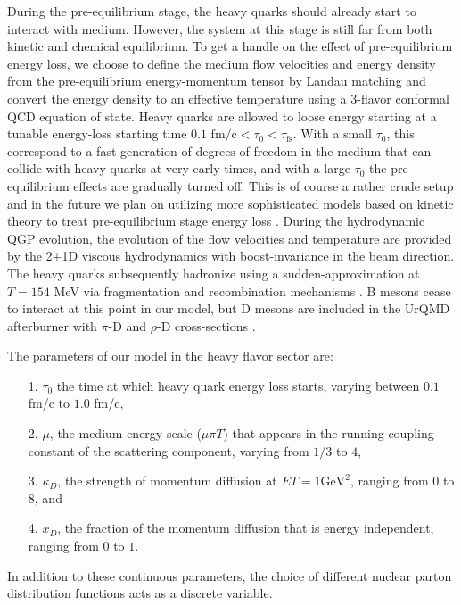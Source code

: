 \documentclass[aps, prc, reprint, amsmath, groupedaddress, nofootinbib]{revtex4-1}
\begin{document}
During the pre-equilibrium stage, the heavy quarks should already start to interact with medium.
However, the system at this stage is still far from both kinetic and chemical equilibrium.
To get a handle on the effect of pre-equilibrium energy loss, we choose to define the medium flow velocities and energy density from the pre-equilibrium energy-momentum tensor by Landau matching and convert the energy density to an effective temperature using a 3-flavor conformal QCD equation of state. 
Heavy quarks are allowed to loose energy starting at a tunable energy-loss starting time $0.1\textrm{ fm/c} < \tau_0 < \tau_{\textrm{fs}}$. 
With a small $\tau_0$, this correspond to a fast generation of degrees of freedom in the medium that can collide with heavy quarks at very early times, and with a large $\tau_0$ the pre-equilibrium effects are gradually turned off.
This is of course a rather crude setup and in the future we plan on utilizing more sophisticated models based on kinetic theory to treat pre-equilibrium stage energy loss \cite{Srivastava:2017bcm}.
During the hydrodynamic QGP evolution, the evolution of the flow velocities and temperature are provided by the 2+1D viscous hydrodynamics with boost-invariance in the beam direction.
The heavy quarks subsequently hadronize using a sudden-approximation at $T = 154$ MeV via fragmentation and recombination mechanisms \cite{Cao:2013ita}. 
B mesons cease to interact at this point in our model, but D mesons are included in the UrQMD afterburner with $\pi$-D and $\rho$-D cross-sections \cite{Lin:2000jp}.

The parameters of our model in the heavy flavor sector are:
\begin{itemize}
\item[1.] $\tau_0$ the time at which heavy quark energy loss starts, varying between $0.1$ fm/c to $1.0$ fm/c,
\item[2.] $\mu$, the medium energy scale ($\mu\pi T$) that appears in the running coupling constant of the scattering component, varying from $1/3$ to $4$,
\item[3.] $\kappa_D$, the strength of momentum diffusion at $ET = 1 \textrm{GeV}^2$, ranging from $0$ to $8$, and
\item[4.] $x_D$, the fraction of the momentum diffusion that is energy independent, ranging from $0$ to $1$.
\end{itemize}
In addition to these continuous parameters, the choice of different nuclear parton distribution functions acts as a discrete variable.
\end{document}
